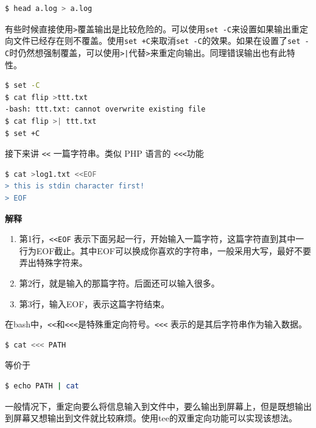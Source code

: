 \documentclass[doctor,openright,twoside]{sjtuthesis}
\providecommand{\tightlist}{%
    \setlength{\itemsep}{0pt}\setlength{\parskip}{0pt}}
\newcommand{\passthrough}[1]{#1}
\theoremstyle{plain}
\theoremstyle{definition}
\theoremstyle{remark}
\theoremstyle{ocrenumbox}
\theoremstyle{plain}
\begin{document}
\begin{lstlisting}[language=bash]
$ head a.log > a.log
\end{lstlisting}

有些时候直接使用\passthrough{\lstinline!>!}覆盖输出是比较危险的。可以使用\passthrough{\lstinline!set -C!}来设置如果输出重定向文件已经存在则不覆盖。使用\passthrough{\lstinline!set +C!}来取消\passthrough{\lstinline!set -C!}的效果。如果在设置了\passthrough{\lstinline!set -C!}时仍然想强制覆盖，可以使用\passthrough{\lstinline!>|!}代替\passthrough{\lstinline!>!}来重定向输出。同理错误输出也有此特性。

\begin{lstlisting}[language=bash]
$ set -C
$ cat flip >ttt.txt
-bash: ttt.txt: cannot overwrite existing file
$ cat flip >| ttt.txt
$ set +C
\end{lstlisting}

接下来讲 \passthrough{\lstinline!<<!} 一篇字符串。类似 PHP 语言的 \passthrough{\lstinline!<<<!}功能

\begin{lstlisting}[language=bash]
$ cat >log1.txt <<EOF 
> this is stdin character first!
> EOF
\end{lstlisting}

\textbf{解释}

\begin{enumerate}
\def\labelenumi{\arabic{enumi}.}
\tightlist
\item
  第1行，\passthrough{\lstinline!<<EOF!} 表示下面另起一行，开始输入一篇字符，这篇字符直到其中一行为EOF截止。其中EOF可以换成你喜欢的字符串，一般采用大写，最好不要弄出特殊字符来。
\item
  第2行，就是输入的那篇字符。后面还可以输入很多。
\item
  第3行，输入EOF，表示这篇字符结束。
\end{enumerate}

在bash中，\passthrough{\lstinline!<<!}和\passthrough{\lstinline!<<<!}是特殊重定向符号。\passthrough{\lstinline!<<<!} 表示的是其后字符串作为输入数据。

\begin{lstlisting}[language=bash]
$ cat <<< PATH
\end{lstlisting}

等价于

\begin{lstlisting}[language=bash]
$ echo PATH | cat
\end{lstlisting}

一般情况下，重定向要么将信息输入到文件中，要么输出到屏幕上，但是既想输出到屏幕又想输出到文件就比较麻烦。使用tee的双重定向功能可以实现该想法。
\end{document}
